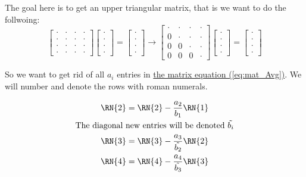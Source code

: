 \documentclass[english,notitlepage]{article}  %
\begin{document}
The goal here is to get an upper triangular matrix, that is we want to do the follwoing:
\begin{equation*}
    \begin{bmatrix}
        \cdot & \cdot & \cdot & \cdot \\
        \cdot & \cdot & \cdot & \cdot \\
        \cdot & \cdot & \cdot & \cdot \\
        \cdot & \cdot & \cdot & \cdot
    \end{bmatrix} \begin{bmatrix}
        \cdot\\
        \cdot\\
        \cdot\\
        \cdot
    \end{bmatrix} = \begin{bmatrix}
        \cdot\\
        \cdot\\
        \cdot\\
        \cdot
    \end{bmatrix}
    \rightarrow
    \begin{bmatrix}
        \cdot & \cdot & \cdot & \cdot \\
        0 & \cdot & \cdot & \cdot \\
        0 & 0 & \cdot & \cdot \\
        0 & 0 & 0 & \cdot
    \end{bmatrix} \begin{bmatrix}
        \cdot\\
        \cdot\\
        \cdot\\
        \cdot
    \end{bmatrix} = \begin{bmatrix}
        \cdot\\
        \cdot\\
        \cdot\\
        \cdot
    \end{bmatrix}
\end{equation*}

So we want to get rid of all $a_i$ entries in \hyperref[eq:mat_Avg]{the matrix equation (\ref*{eq:mat_Avg})}. We will number and denote the rows with roman numerals.

\begin{gather}
    \RN{2} = \RN{2} - \frac{a_2}{b_1}\RN{1}\\
    \text{The diagonal new entries will be denoted } \tilde{b_i} \nonumber \\
    \RN{3} = \RN{3} - \frac{a_3}{\tilde{b_2}}\RN{2}\\
    \RN{4} = \RN{4} - \frac{a_4}{\tilde{b_3}}\RN{3}\\
\end{gather}
\end{document}
